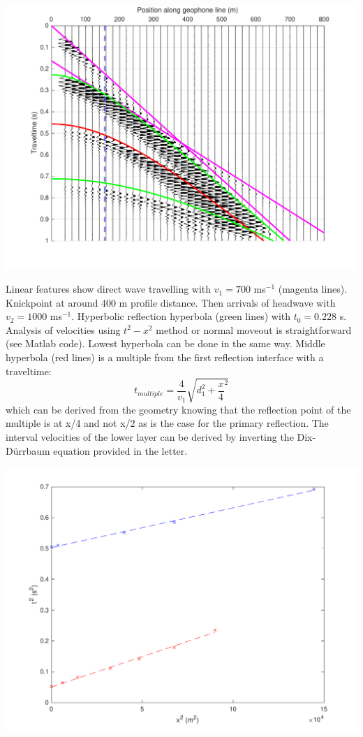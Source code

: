     \begin{tcolorbox}[enhanced jigsaw,breakable,pad at break*=1mm,
    colback=blue!5!white,colframe=babyblueeyes,title=Solutions,
    watermark color=white]
    
        \begin{center}
        \includegraphics*[width=0.8\linewidth]{Figures/Seismics/ShotGather_solutions.pdf}
        \end{center}
    Linear features show direct wave travelling with $v_1 = 700 $ ms$^{-1}$ (magenta lines). Knickpoint at around 400 m profile distance. Then arrivals of headwave with $v_2 = 1000 $ ms$^{-1}$. Hyperbolic reflection hyperbola (green lines) with $t_0 = 0.228$ s. Analysis of velocities using $t^2-x^2$ method or normal moveout is straightforward (see Matlab code). Lowest hyperbola can be done in the same way. Middle hyperbola (red lines) is a multiple from the first reflection interface with a traveltime: 
    $$
      t_{multiple} = \frac{4}{v_1}\sqrt{d_1^2+\frac{x}{4}^2}  
    $$
    which can be derived from the geometry knowing that the reflection point of the multiple is at x/4 and not x/2 as is the case for the primary reflection. The interval velocities of the lower layer can be derived by inverting the Dix-Dürrbaum equation provided in the letter.
    \begin{center}
        \includegraphics*[width=0.5\linewidth]{Figures/Seismics/TsqXsq.pdf}
        \end{center}
        
\end{tcolorbox}
\fi

